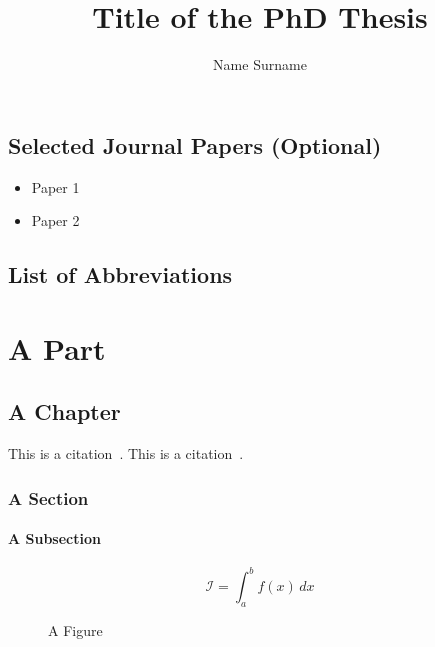 \documentclass[12pt, a4paper, twoside, numbers=enddot, bibliography=totoc, listof=totoc, headings=optiontoheadandtoc]{uniudthesis}
\author{Name Surname}
\title{Title of the PhD Thesis}
\begin{document}
	\maketitle
	\frontmatter\pagestyle{plain}
	\makeabstract
	\chapter{Selected Journal Papers (Optional)}
		\begin{itemize}
			\item Paper 1
			\item Paper 2
		\end{itemize}
	
	\cleardoublepage{}\tableofcontents
	\listoffigures
	\listoftables
	\chapter{List of Abbreviations}
		\lipsum[1-5]

	\mainmatter\pagestyle{headings}
	\part{A Part}
		\chapter{A Chapter}
			\strip{\lipsum[1]}
			This is a citation~\cite{key_1}. This is a citation~\cite{key_2}.
			\section{A Section}
				\subsection{A Subsection}
				\lipsum[1-5]
					\begin{equation}
						\mathcal{I} = \int_a^b f(x)\,dx
					\end{equation}
					
					\begin{figure}[h!]
						\caption{A Figure}
					\end{figure}
					
\end{document}
